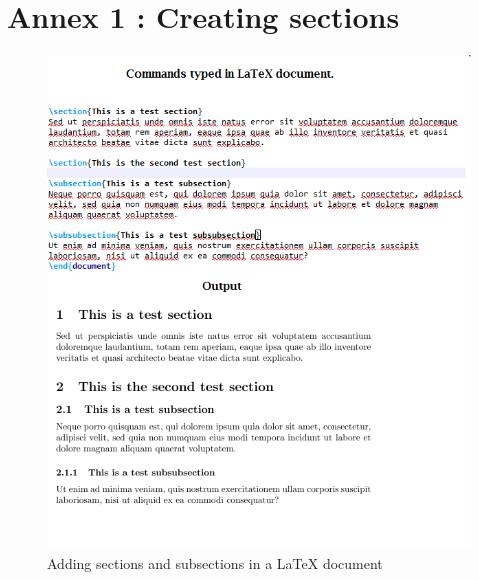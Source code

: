 \documentclass[12pts]{report}
\begin{document}
\section*{Annex 1 : Creating sections}
\label{sec:Annex}
\begin{figure}[H]
	\centering
	\includegraphics[width=0.7\linewidth]{../img/section}
	\caption{Adding sections and subsections in a {\LaTeX} document}
	\label{fig:adding sections}
\end{figure}
\end{document}
